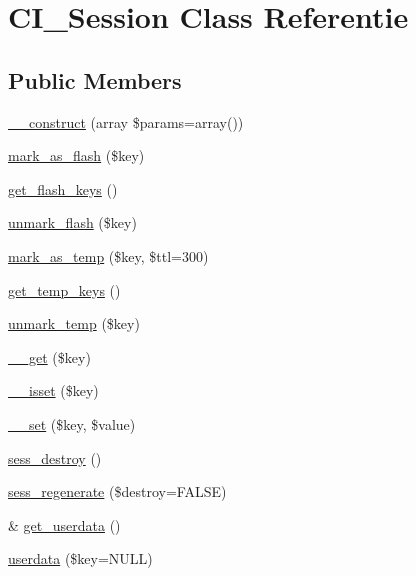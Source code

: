 \hypertarget{class_c_i___session}{}\section{C\+I\+\_\+\+Session Class Referentie}
\label{class_c_i___session}
\subsection*{Public Members}
\begin{DoxyCompactItemize}
\item 
\mbox{\hyperlink{class_c_i___session_a85ac5b7f54ad67ec6b5b9dc282717602}{\+\_\+\+\_\+construct}} (array \$params=array())
\item 
\mbox{\hyperlink{class_c_i___session_a81fdbc2498fc26532aee037f03dbaf55}{mark\+\_\+as\+\_\+flash}} (\$key)
\item 
\mbox{\hyperlink{class_c_i___session_a996e70387750cdc480712c1585743d8d}{get\+\_\+flash\+\_\+keys}} ()
\item 
\mbox{\hyperlink{class_c_i___session_a8e89303bfdff75a20528986c2bcdba86}{unmark\+\_\+flash}} (\$key)
\item 
\mbox{\hyperlink{class_c_i___session_ab55f3c6806c359d98edd6138ef33ecf0}{mark\+\_\+as\+\_\+temp}} (\$key, \$ttl=300)
\item 
\mbox{\hyperlink{class_c_i___session_a4fd9f48ff9bcf093778529cb7389eddb}{get\+\_\+temp\+\_\+keys}} ()
\item 
\mbox{\hyperlink{class_c_i___session_a602eaf2b4a6936ed9bb8750892fac551}{unmark\+\_\+temp}} (\$key)
\item 
\mbox{\hyperlink{class_c_i___session_a4537dad3b44254124991341cc91b28fb}{\+\_\+\+\_\+get}} (\$key)
\item 
\mbox{\hyperlink{class_c_i___session_ae858fed7cd2822fbceac154138b68baa}{\+\_\+\+\_\+isset}} (\$key)
\item 
\mbox{\hyperlink{class_c_i___session_a79b36d71c6f1d4f9e6c4c3e34c081456}{\+\_\+\+\_\+set}} (\$key, \$value)
\item 
\mbox{\hyperlink{class_c_i___session_a9451d1625c402b8d712aedaa5ebc752d}{sess\+\_\+destroy}} ()
\item 
\mbox{\hyperlink{class_c_i___session_afec342ef8722ac0ce4a672e6cfad60c0}{sess\+\_\+regenerate}} (\$destroy=F\+A\+L\+SE)
\item 
\& \mbox{\hyperlink{class_c_i___session_a85456fcd9f556e20767051fc33762607}{get\+\_\+userdata}} ()
\item 
\mbox{\hyperlink{class_c_i___session_ab10006d10762845f93392ef4c2884df6}{userdata}} (\$key=N\+U\+LL)

\end{DoxyCompactItemize}
